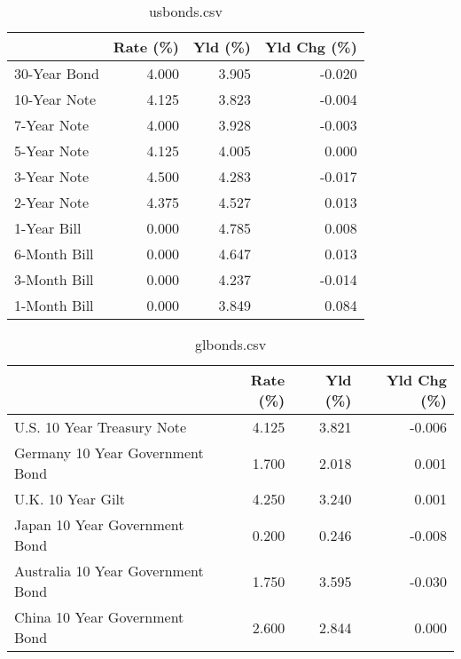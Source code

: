 \documentclass{article}%
\begin{document}
%


\begin{table}[htbp]%
\caption{usbonds.csv}%
\centering%
\begin{adjustbox}{width=1\textwidth}%
\begin{tabular}{lrrr}
\toprule
             &  Rate (\%) &  Yld (\%) &  Yld Chg (\%) \\
\midrule
30-Year Bond &     4.000 &    3.905 &       -0.020 \\
10-Year Note &     4.125 &    3.823 &       -0.004 \\
 7-Year Note &     4.000 &    3.928 &       -0.003 \\
 5-Year Note &     4.125 &    4.005 &        0.000 \\
 3-Year Note &     4.500 &    4.283 &       -0.017 \\
 2-Year Note &     4.375 &    4.527 &        0.013 \\
 1-Year Bill &     0.000 &    4.785 &        0.008 \\
6-Month Bill &     0.000 &    4.647 &        0.013 \\
3-Month Bill &     0.000 &    4.237 &       -0.014 \\
1-Month Bill &     0.000 &    3.849 &        0.084 \\
\bottomrule
\end{tabular}
%
\end{adjustbox}%
\end{table}

%


\begin{table}[htbp]%
\caption{glbonds.csv}%
\centering%
\begin{adjustbox}{width=1\textwidth}%
\begin{tabular}{lrrr}
\toprule
                                  &  Rate (\%) &  Yld (\%) &  Yld Chg (\%) \\
\midrule
       U.S. 10 Year Treasury Note &     4.125 &    3.821 &       -0.006 \\
  Germany 10 Year Government Bond &     1.700 &    2.018 &        0.001 \\
                U.K. 10 Year Gilt &     4.250 &    3.240 &        0.001 \\
    Japan 10 Year Government Bond &     0.200 &    0.246 &       -0.008 \\
Australia 10 Year Government Bond &     1.750 &    3.595 &       -0.030 \\
    China 10 Year Government Bond &     2.600 &    2.844 &        0.000 \\
\bottomrule
\end{tabular}
%
\end{adjustbox}%
\end{table}
\end{document}
